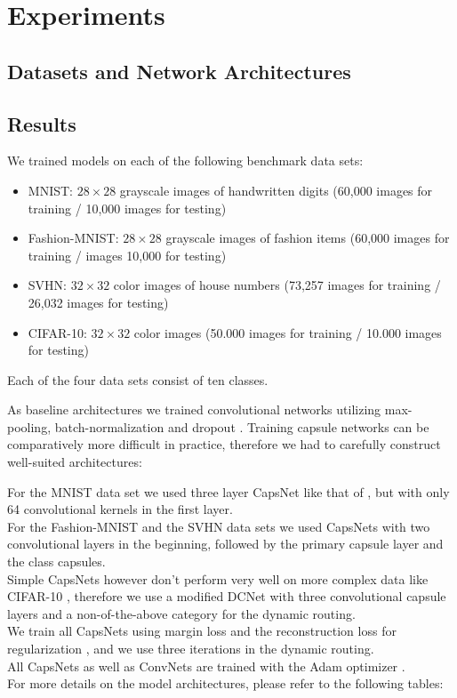 
\section{Experiments}

\subsection{Datasets and Network Architectures}



\subsection{Results}
 
 We trained models on each of the following benchmark data sets:

\begin{itemize}
	\item MNIST: $28\times28$ grayscale images of handwritten digits (60,000  images for training / 10,000  images for testing) \cite{mnist}
	\item Fashion-MNIST:  $28\times28$ grayscale images of fashion items (60,000 images for training / images 10,000 for testing) \cite{fashion}
	\item SVHN: $32\times32$ color images of house numbers (73,257  images for training / 26,032 images for testing) \cite{svhn}
	\item CIFAR-10: $32\times32$ color images (50.000  images for training / 10.000  images for testing) \cite{cifar}
\end{itemize}

Each of the four data sets consist of ten classes.

As baseline architectures we trained convolutional networks utilizing max-pooling,
batch-normalization \citep{batchnorm} and dropout \citep{dropout}.
Training capsule networks can be comparatively more difficult in practice, therefore we had to carefully construct well-suited architectures:

For the MNIST data set we used three layer CapsNet like that of \citet{capsules}, but with only 64 convolutional kernels in the first layer. \\
For the Fashion-MNIST and the SVHN data sets we used CapsNets with two convolutional layers in the beginning, followed by the primary capsule layer and the class capsules. \\
Simple CapsNets however don't perform very well on more complex data like CIFAR-10 \citep{complex}, therefore we use a modified DCNet \citep{denseanddiverse} with three convolutional capsule layers and a non-of-the-above category for the dynamic routing. \\
We train all CapsNets using margin loss and the reconstruction loss for regularization \citep{capsules}, and we use three iterations in the dynamic routing. \\
All CapsNets as well as ConvNets are trained with the Adam optimizer \citep{adam}. \\
For more details on the model architectures, please refer to the following tables: 

